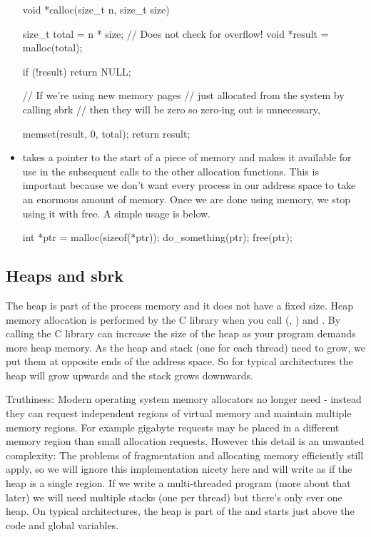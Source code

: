 \begin{itemize}
\begin{code}[language=C]
void *calloc(size_t n, size_t size)
{
    size_t total = n * size; // Does not check for overflow!
    void *result = malloc(total);
    
    if (!result) return NULL;
    
// If we're using new memory pages 
// just allocated from the system by calling sbrk
// then they will be zero so zero-ing out is unnecessary,

    memset(result, 0, total);
    return result; 
}
\end{code}

\item {} takes a pointer to the start of a piece of memory and makes it available for use in the subsequent calls to the other allocation functions. This is important because we don't want every process in our address space to take an enormous amount of memory. Once we are done using memory, we stop using it with free. A simple usage is below.

\begin{code}[language=C]
int *ptr = malloc(sizeof(*ptr));
do_something(ptr);
free(ptr);
\end{code}

\end{itemize}

\subsection{Heaps and sbrk}

The heap is part of the process memory and it does not have a fixed size. Heap memory allocation is performed by the C library when you call  (, ) and . By calling  the C library can increase the size of the heap as your program demands more heap memory. As the heap and stack (one for each thread) need to grow, we put them at opposite ends of the address space. So for typical architectures the heap will grow upwards and the stack grows downwards. 

Truthiness: Modern operating system memory allocators no longer need  - instead they can request independent regions of virtual memory and maintain multiple memory regions. For example gigabyte requests may be placed in a different memory region than small allocation requests. However this detail is an unwanted complexity: The problems of fragmentation and allocating memory efficiently still apply, so we will ignore this implementation nicety here and will write as if the heap is a single region. If we write a multi-threaded program (more about that later) we will need multiple stacks (one per thread) but there's only ever one heap. On typical architectures, the heap is part of the  and starts just above the code and global variables.

